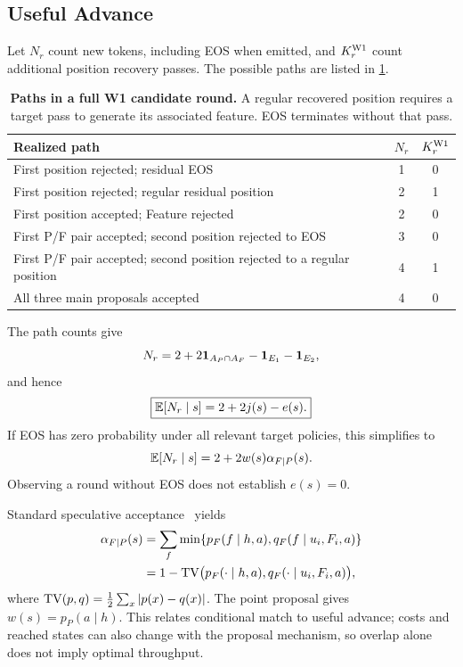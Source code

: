 \subsection{Useful Advance}
\label{app:advance}
Let $N_r$ count new tokens, including EOS when emitted, and $K_r^{\mathrm{W1}}$ count additional position recovery passes. The possible paths are listed in \cref{tab:paths}.
\begin{table}[t]
\centering\small
\caption{\textbf{Paths in a full W1 candidate round.} A regular recovered position requires a target pass to generate its associated feature. EOS terminates without that pass.}
\label{tab:paths}
\begin{tabular}{@{}lcc@{}}\toprule
Realized path & $N_r$ & $K_r^{\mathrm{W1}}$\\\midrule
First position rejected; residual EOS & 1 & 0\\
First position rejected; regular residual position & 2 & 1\\
First position accepted; Feature rejected & 2 & 0\\
First P/F pair accepted; second position rejected to EOS & 3 & 0\\
First P/F pair accepted; second position rejected to a regular position & 4 & 1\\
All three main proposals accepted & 4 & 0\\\bottomrule
\end{tabular}
\end{table}
The path counts give
\begin{equation}
N_r=2+2\mathbf{1}_{A_P\cap A_F}-\mathbf{1}_{E_1}-\mathbf{1}_{E_2},
\end{equation}
and hence
\begin{equation}
\boxed{\mathbb{E}[N_r\mid s]=2+2j(s)-e(s).}
\end{equation}
If EOS has zero probability under all relevant target policies, this simplifies to
\begin{equation}
\mathbb{E}[N_r\mid s]=2+2w(s)\alpha_{F\mid P}(s).
\end{equation}
Observing a round without EOS does not establish $e(s)=0$.

Standard speculative acceptance~\cite{leviathan} yields
\begin{align}
\alpha_{F\mid P}(s)
&=\sum_f\min\{p_F(f\mid h,a),q_F(f\mid u_i,F_i,a)\}\nonumber\\
&=1-\operatorname{TV}\bigl(p_F(\cdot\mid h,a),q_F(\cdot\mid u_i,F_i,a)\bigr),
\end{align}
where $\operatorname{TV}(p,q)=\tfrac12\sum_x|p(x)-q(x)|$. The point proposal gives $w(s)=p_P(a\mid h)$. This relates conditional match to useful advance; costs and reached states can also change with the proposal mechanism, so overlap alone does not imply optimal throughput.


